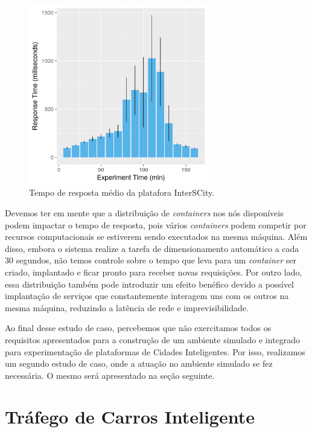 \begin{figure}[ht]
	\centering
	\includegraphics[width=0.7\textwidth]{figuras/response_time_mean.png}
    \caption{Tempo de resposta médio da platafora InterSCity.}
	\label{fig:responsetime}
\end{figure}


Devemos ter em mente que a distribuição de \textit{containers} nos nós disponíveis podem impactar o tempo de resposta, pois vários \textit{containers} podem competir por recursos computacionais se estiverem
sendo executados na mesma máquina.
Além disso, embora o sistema realize a tarefa de dimensionamento automático a cada 30 segundos, não temos controle sobre o tempo que leva para um \textit{container} ser criado, implantado e ficar pronto
para receber novas requisições.
Por outro lado, essa distribuição também pode introduzir um efeito benéfico devido a possível implantação de serviços que constantemente interagem uns com os outros na mesma máquina, reduzindo a latência
de rede e imprevisibilidade.

Ao final desse estudo de caso, percebemos que não exercitamos todos os requisitos apresentados para a construção de um ambiente simulado e integrado para experimentação de plataformas de Cidades Inteligentes.
Por isso, realizamos um segundo estudo de caso, onde a atuação no ambiente simulado se fez necessária.
O mesmo será apresentado na seção seguinte.

\section{Tráfego de Carros Inteligente}

